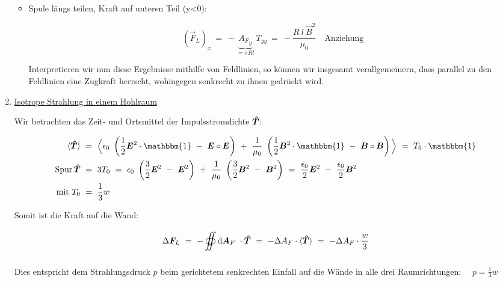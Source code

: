 \begin{enumerate}[label=\roman*)]
\begin{itemize}
\item Spule längs teilen, Kraft auf unteren Teil (y<0):

\begin{equation*}
(\vec{F}_L)_x \ = \ -\underbrace{{A_F}_y}_{=\pi R l} \ T_{yy} \ = \ -\frac{R \ l \ \vec{B}^2}{\mu_0} \quad \text{Anziehung}
\end{equation*}

Interpretieren wir nun diese Ergebnisse mithilfe von Feldlinien, so können wir insgesamt verallgemeinern, dass parallel zu den Feldlinien eine Zugkraft herrscht, wohingegen senkrecht zu ihnen gedrückt wird. 
\end{itemize}

\item \underline{Isotrope Strahlung in einem Hohlraum}

Wir betrachten das Zeit- und Ortsmittel der Impulsstromdichte $\bm{\hat{T}}$:

\begin{align*}
\langle\tens{T}\rangle \ &= \ \Big\langle \epsilon_0 \ \left(\frac{1}{2}\vec{E}^2\cdot\mathbbm{1} \ - \ \vec{E}\circ\vec{E}\right) \ + \ \frac{1}{\mu_0} \ \left(\frac{1}{2}\vec{B}^2\cdot\mathbbm{1} \ - \ \vec{B}\circ\vec{B}\right) \Big\rangle \ = \ T_0 \cdot \mathbbm{1}\\
\operatorname{Spur} \tens{T} \ &= \ 3 T_0 \ = \ \epsilon_0 \ \left(\frac{3}{2}\vec{E}^2 \ - \ \vec{E}^2\right) \ + \ \frac{1}{\mu_0} \ \left(\frac{3}{2}\vec{B}^2 \ - \ \vec{B}^2\right) \ = \ \frac{\epsilon_0}{2}\vec{E}^2 \ - \ \frac{\epsilon_0}{2}\vec{B}^2 \\
\text{mit } T_0 \ &= \ \frac{1}{3} w 
\end{align*}

Somit ist die Kraft auf die Wand:

\begin{equation*}
\Delta\vec{F}_L \ = \ -\Oiint{}{}{\vec{A}_F} \cdot\tens{T} \ = \ - \Delta A_F \cdot \langle\tens{T} \rangle \ = \ - \Delta A_F \cdot \frac{w}{3}
\end{equation*}

Dies entspricht dem Strahlungsdruck $p$ beim gerichtetem senkrechten Einfall auf die Wände in alle drei Raumrichtungen: $\quad p = \frac{1}{3}w$
\end{enumerate}